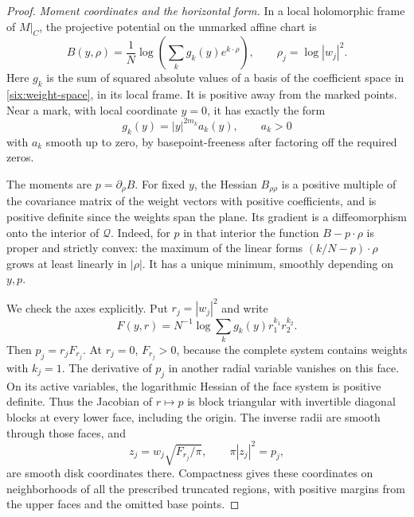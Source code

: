 \begin{proof}
\emph{Moment coordinates and the horizontal form.}
In a local holomorphic frame of \(M|_C\), the projective potential
on the unmarked affine chart is
\begin{equation}\label{six:potential}
 B(y,\rho)=\frac1N\log\left(\sum_k g_k(y)e^{k\cdot\rho}\right),
 \qquad \rho_j=\log|w_j|^2.
\end{equation}
Here \(g_k\) is the sum of squared absolute values of a basis of
the coefficient space in \eqref{six:weight-space}, in its local
frame.  It is positive away from the marked points.  Near a mark,
with local coordinate \(y=0\), it has exactly the form
\begin{equation}\label{six:coefficient-zero}
 g_k(y)=|y|^{2m_k}a_k(y),\qquad a_k>0
\end{equation}
with \(a_k\) smooth up to zero, by basepoint-freeness after
factoring off the required zeros.

The moments are \(p=\partial_\rho B\).
For fixed \(y\), the Hessian \(B_{\rho\rho}\) is a positive
multiple of the covariance matrix of the weight vectors with
positive coefficients, and is positive definite since the
weights span the plane.  Its gradient is a diffeomorphism onto
the interior of \(\mathcal Q\).  Indeed, for \(p\) in that
interior the function \(B-p\cdot\rho\) is proper and strictly
convex: the maximum of the linear forms
\((k/N-p)\cdot\rho\) grows at least linearly in \(|\rho|\).
It has a unique minimum, smoothly depending on \(y,p\).

We check the axes explicitly.  Put \(r_j=|w_j|^2\) and write
\[
 F(y,r)=N^{-1}\log\sum_k g_k(y)r_1^{k_1}r_2^{k_2}.
\]
Then \(p_j=r_jF_{r_j}\).  At \(r_j=0\), \(F_{r_j}>0\),
because the complete system contains weights with \(k_j=1\).
The derivative of \(p_j\) in another radial variable vanishes
on this face.  On its active variables, the logarithmic Hessian
of the face system is positive definite.  Thus the Jacobian
of \(r\mapsto p\) is block triangular with invertible diagonal
blocks at every lower face, including the origin.
The inverse radii are smooth through those faces, and
\[
 z_j=w_j\sqrt{F_{r_j}/\pi},\qquad \pi|z_j|^2=p_j,
\]
are smooth disk coordinates there.
Compactness gives these coordinates on neighborhoods of all
the prescribed truncated regions, with positive margins from
the upper faces and the omitted base points.


\end{proof}
